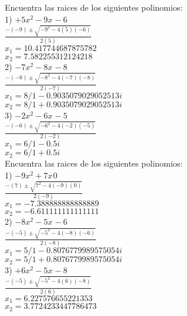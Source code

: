 \documentclass[a4paper,12pt]{article}
\begin{document}
 \pagebreak 
Encuentra las raices de los siguientes polinomios: \vspace{1cm}\\ 
1) $ +5x^{2}-9x^{}-6$ 
\vspace{0.5cm}\\ 
$\frac{-(-9)\pm\sqrt{-9^2-4(5)(-6)}  }{2(5)}$
\vspace{0.5cm}\\
$x_1=10.417744687875782$\\
$x_2=7.582255312124218$
\vspace{1cm}\\ 
2) $ -7x^{2}-8x^{}-8$ 
\vspace{0.5cm}\\ 
$\frac{-(-8)\pm\sqrt{-8^2-4(-7)(-8)}  }{2(-7)}$
\vspace{0.5cm}\\
$x_1=8/1-0.9035079029052513i$\\
$x_2=8/1+0.9035079029052513i$
\vspace{1cm}\\ 
3) $ -2x^{2}-6x^{}-5$ 
\vspace{0.5cm}\\ 
$\frac{-(-6)\pm\sqrt{-6^2-4(-2)(-5)}  }{2(-2)}$
\vspace{0.5cm}\\
$x_1=6/1-0.5i$\\
$x_2=6/1+0.5i$
\vspace{1cm}\\ 

 \pagebreak 
Encuentra las raices de los siguientes polinomios: \vspace{1cm}\\ 
1) $ -9x^{2}+7x^{}0$ 
\vspace{0.5cm}\\ 
$\frac{-(7)\pm\sqrt{7^2-4(-9)(0)}  }{2(-9)}$
\vspace{0.5cm}\\
$x_1=-7.388888888888889$\\
$x_2=-6.611111111111111$
\vspace{1cm}\\ 
2) $ -8x^{2}-5x^{}-6$ 
\vspace{0.5cm}\\ 
$\frac{-(-5)\pm\sqrt{-5^2-4(-8)(-6)}  }{2(-8)}$
\vspace{0.5cm}\\
$x_1=5/1-0.8076779989575054i$\\
$x_2=5/1+0.8076779989575054i$
\vspace{1cm}\\ 
3) $ +6x^{2}-5x^{}-8$ 
\vspace{0.5cm}\\ 
$\frac{-(-5)\pm\sqrt{-5^2-4(6)(-8)}  }{2(6)}$
\vspace{0.5cm}\\
$x_1=6.227576655221353$\\
$x_2=3.7724233447786473$
\vspace{1cm}\\ 
\end{document}
